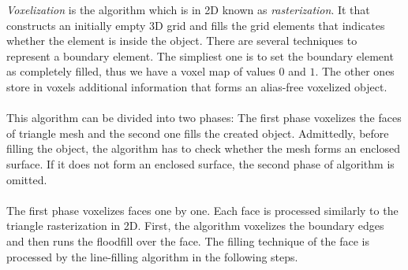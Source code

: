 \emph{Voxelization} is the algorithm which is in 2D known as \emph{rasterization}.
It that constructs an initially empty 3D grid and fills the
grid elements that indicates whether the element is inside the object\cite{Cohen-Or1995}. There are several techniques
to represent a boundary element. The simpliest one is to set the boundary element as completely filled, 
thus we have a voxel map of values $0$ and $1$. The other ones store in voxels additional
information that forms an alias-free voxelized object\cite{Wang1993}.\\
\\
This algorithm can be divided into two phases: The first phase voxelizes the faces of triangle mesh and the
second one fills the created object. Admittedly, before filling the object, the algorithm has to check
whether the mesh forms an enclosed surface. If it does not form an enclosed surface, the second phase of
algorithm is omitted.\\
\\
The first phase voxelizes faces one by one. Each face is processed similarly to the triangle 
rasterization in 2D.
First, the algorithm voxelizes the boundary edges and then runs the floodfill over the face. The filling
technique of the face is processed by the line-filling algorithm in the following steps. 

